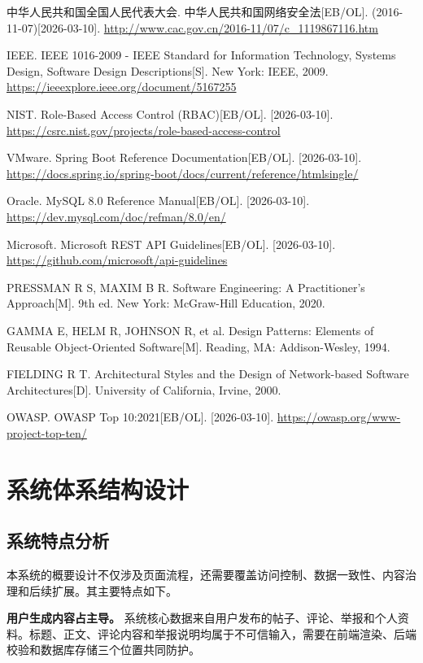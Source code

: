 \documentclass[UTF8,zihao=-4,a4paper]{ctexart}
\newcommand{\term}[1]{\textbf{#1}}
\begin{document}
\begin{enumerate}[label={[}\arabic*{]},leftmargin=2.5em]
\item 中华人民共和国全国人民代表大会. 中华人民共和国网络安全法[EB/OL]. (2016-11-07)[2026-03-10]. \url{http://www.cac.gov.cn/2016-11/07/c_1119867116.htm}
\item IEEE. IEEE 1016-2009 - IEEE Standard for Information Technology, Systems Design, Software Design Descriptions[S]. New York: IEEE, 2009. \url{https://ieeexplore.ieee.org/document/5167255}
\item NIST. Role-Based Access Control (RBAC)[EB/OL]. [2026-03-10]. \url{https://csrc.nist.gov/projects/role-based-access-control}
\item VMware. Spring Boot Reference Documentation[EB/OL]. [2026-03-10]. \url{https://docs.spring.io/spring-boot/docs/current/reference/htmlsingle/}
\item Oracle. MySQL 8.0 Reference Manual[EB/OL]. [2026-03-10]. \url{https://dev.mysql.com/doc/refman/8.0/en/}
\item Microsoft. Microsoft REST API Guidelines[EB/OL]. [2026-03-10]. \url{https://github.com/microsoft/api-guidelines}
\item PRESSMAN R S, MAXIM B R. Software Engineering: A Practitioner's Approach[M]. 9th ed. New York: McGraw-Hill Education, 2020.
\item GAMMA E, HELM R, JOHNSON R, et al. Design Patterns: Elements of Reusable Object-Oriented Software[M]. Reading, MA: Addison-Wesley, 1994.
\item FIELDING R T. Architectural Styles and the Design of Network-based Software Architectures[D]. University of California, Irvine, 2000.
\item OWASP. OWASP Top 10:2021[EB/OL]. [2026-03-10]. \url{https://owasp.org/www-project-top-ten/}
\end{enumerate}

\section{系统体系结构设计}

\subsection{系统特点分析}

本系统的概要设计不仅涉及页面流程，还需要覆盖访问控制、数据一致性、内容治理和后续扩展。其主要特点如下。

\term{用户生成内容占主导。} 系统核心数据来自用户发布的帖子、评论、举报和个人资料。标题、正文、评论内容和举报说明均属于不可信输入，需要在前端渲染、后端校验和数据库存储三个位置共同防护。
\end{document}
